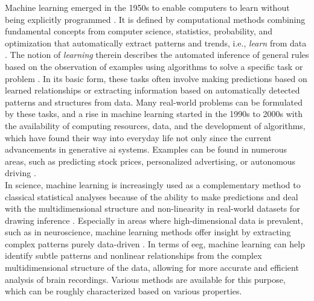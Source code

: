 Machine learning emerged in the 1950s to enable computers to learn without being explicitly programmed \cite{Samual1959}. It is defined by computational methods combining fundamental concepts from computer science, statistics, probability, and optimization that automatically extract patterns and trends, i.e., \textit{learn} from data \cite{Hastie2009}. The notion of \textit{learning} therein describes the automated inference of general rules based on the observation of examples using algorithms to solve a specific task or problem \cite{Von_luxburg2011}. In its basic form, these tasks often involve making predictions based on learned relationships or extracting information based on automatically detected patterns and structures from data. Many real-world problems can be formulated by these tasks, and a rise in machine learning started in the 1990s to 2000s with the availability of computing resources, data, and the development of algorithms, which have found their way into everyday life not only since the current advancements in generative \gls{ai} systems. Examples can be found in numerous areas, such as predicting stock prices, personalized advertising, or autonomous driving \cite{Rudin2014}.\\
In science, machine learning is increasingly used as a complementary method to classical statistical analyses because of the ability to make predictions and deal with the multidimensional structure and non-linearity in real-world datasets for drawing inference \cite{Bzdok2018}. Especially in areas where high-dimensional data is prevalent, such as in neuroscience, machine learning methods offer insight by extracting complex patterns purely data-driven \cite{Brunton2019}. In terms of \gls{eeg}, machine learning can help identify subtle patterns and nonlinear relationships from the complex multidimensional structure of the data, allowing for more accurate and efficient analysis of brain recordings. Various methods are available for this purpose, which can be roughly characterized based on various properties. 

